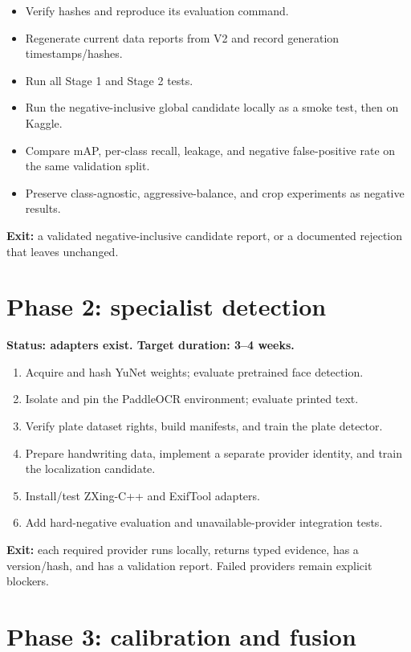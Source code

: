 \begin{itemize}[leftmargin=6mm]
  \item Verify  hashes and reproduce its evaluation command.
  \item Regenerate current data reports from V2 and record generation timestamps/hashes.
  \item Run all Stage 1 and Stage 2 tests.
  \item Run the negative-inclusive global candidate locally as a smoke test, then on Kaggle.
  \item Compare mAP, per-class recall, leakage, and negative false-positive rate on the same validation split.
  \item Preserve class-agnostic, aggressive-balance, and crop experiments as negative results.
\end{itemize}

\textbf{Exit:} a validated negative-inclusive candidate report, or a documented rejection that leaves  unchanged.

\section{Phase 2: specialist detection}

\textbf{Status: adapters exist. Target duration: 3--4 weeks.}

\begin{enumerate}[leftmargin=7mm]
  \item Acquire and hash YuNet weights; evaluate pretrained face detection.
  \item Isolate and pin the PaddleOCR environment; evaluate printed text.
  \item Verify plate dataset rights, build manifests, and train the plate detector.
  \item Prepare handwriting data, implement a separate provider identity, and train the localization candidate.
  \item Install/test ZXing-C++ and ExifTool adapters.
  \item Add hard-negative evaluation and unavailable-provider integration tests.
\end{enumerate}

\textbf{Exit:} each required provider runs locally, returns typed evidence, has a version/hash, and has a validation report. Failed providers remain explicit blockers.

\section{Phase 3: calibration and fusion}

